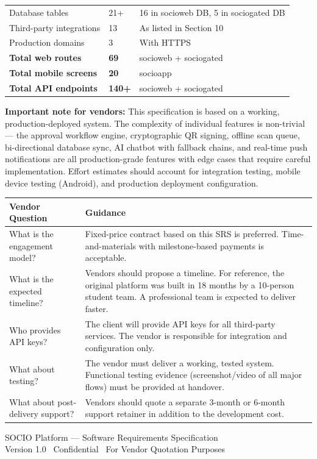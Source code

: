 \documentclass[12pt,a4paper]{article}
\begin{document}
\begin{tabularx}{\textwidth}{L{6cm} C{2cm} X}
Database tables & 21+ & 16 in socioweb DB, 5 in sociogated DB \\
Third-party integrations & 13 & As listed in Section 10 \\
Production domains & 3 & With HTTPS \\
\midrule
{}
\textbf{Total web routes} & \textbf{69} & socioweb + sociogated \\
\textbf{Total mobile screens} & \textbf{20} & socioapp \\
\textbf{Total API endpoints} & \textbf{140+} & socioweb + sociogated \\
\bottomrule
\end{tabularx}

\vspace{0.8cm}

\begin{reqbox}
\textbf{Important note for vendors:} This specification is based on a working, production-deployed system. The complexity of individual features is non-trivial — the approval workflow engine, cryptographic QR signing, offline scan queue, bi-directional database sync, AI chatbot with fallback chains, and real-time push notifications are all production-grade features with edge cases that require careful implementation. Effort estimates should account for integration testing, mobile device testing (Android), and production deployment configuration.
\end{reqbox}

\vspace{0.5cm}

\begin{tabularx}{\textwidth}{L{5cm} X}
\toprule
{}
\textbf{Vendor Question} & \textbf{Guidance} \\
\midrule
What is the engagement model? & Fixed-price contract based on this SRS is preferred. Time-and-materials with milestone-based payments is acceptable. \\
What is the expected timeline? & Vendors should propose a timeline. For reference, the original platform was built in 18 months by a 10-person student team. A professional team is expected to deliver faster. \\
Who provides API keys? & The client will provide API keys for all third-party services. The vendor is responsible for integration and configuration only. \\
What about testing? & The vendor must deliver a working, tested system. Functional testing evidence (screenshot/video of all major flows) must be provided at handover. \\
What about post-delivery support? & Vendors should quote a separate 3-month or 6-month support retainer in addition to the development cost. \\
\bottomrule
\end{tabularx}

\vspace{2cm}
\begin{center}
{\small\color{darkgray}
SOCIO Platform — Software Requirements Specification\\
Version 1.0 \textbullet\ Confidential \textbullet\ For Vendor Quotation Purposes \textbullet\ \the\year
}
\end{center}
\end{document}
